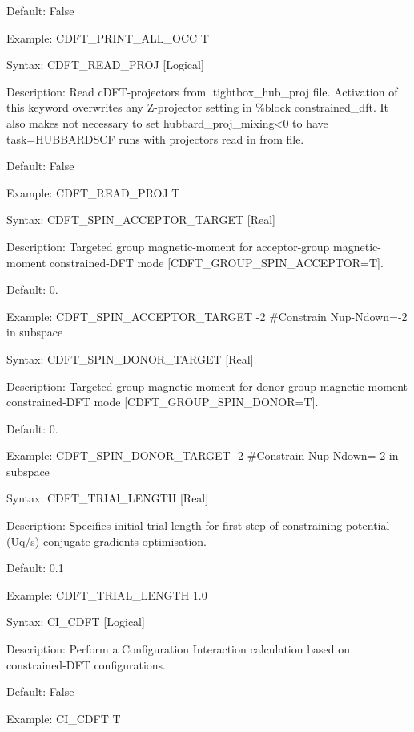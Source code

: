 \documentclass[letterpaper,10pt,english]{sphinxmanual}
\begin{document}
Default: False

Example: CDFT\_PRINT\_ALL\_OCC T


Syntax: CDFT\_READ\_PROJ {[}Logical{]}

Description: Read cDFT-projectors from .tightbox\_hub\_proj file.
Activation of this keyword overwrites any Z-projector setting in \%block
constrained\_dft. It also makes not necessary to set
hubbard\_proj\_mixing\textless{}0 to have task=HUBBARDSCF runs with projectors
read in from file.

Default: False

Example: CDFT\_READ\_PROJ T


Syntax: CDFT\_SPIN\_ACCEPTOR\_TARGET {[}Real{]}

Description: Targeted group magnetic-moment for acceptor-group
magnetic-moment constrained-DFT mode {[}CDFT\_GROUP\_SPIN\_ACCEPTOR=T{]}.

Default: 0.

Example: CDFT\_SPIN\_ACCEPTOR\_TARGET -2 \#Constrain Nup-Ndown=-2 in
subspace


Syntax: CDFT\_SPIN\_DONOR\_TARGET {[}Real{]}

Description: Targeted group magnetic-moment for donor-group
magnetic-moment constrained-DFT mode {[}CDFT\_GROUP\_SPIN\_DONOR=T{]}.

Default: 0.

Example: CDFT\_SPIN\_DONOR\_TARGET -2 \#Constrain Nup-Ndown=-2 in
subspace


Syntax: CDFT\_TRIAl\_LENGTH {[}Real{]}

Description: Specifies initial trial length for first step of
constraining-potential (Uq/s) conjugate gradients optimisation.

Default: 0.1

Example: CDFT\_TRIAL\_LENGTH 1.0


Syntax: CI\_CDFT {[}Logical{]}

Description: Perform a Configuration Interaction calculation based on
constrained-DFT configurations.

Default: False

Example: CI\_CDFT T
\end{document}
